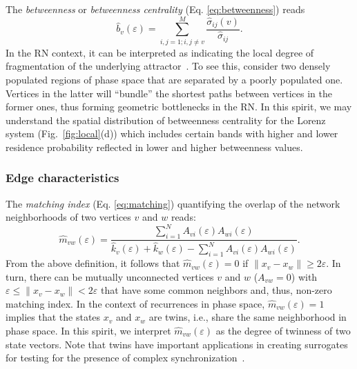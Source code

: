 The \textit{betweenness} or \textit{betweenness centrality} (Eq. \eqref{eq:betweenness}) reads 
\begin{equation}
\hat{b}_v(\varepsilon)=\sum_{i,j=1; i,j\neq v}^M \frac{\hat{\sigma}_{ij}(v)}{\hat{\sigma}_{ij}}.
\label{eq:betweennessRN}
\end{equation}
\noindent
In the RN context, it can be interpreted as indicating the local degree of fragmentation of the underlying attractor~\cite{Donner2010a}. To see this, consider two densely populated regions of phase space that are separated by a poorly populated one. Vertices in the latter will ``bundle'' the shortest paths between vertices in the former ones, thus forming geometric bottlenecks in the RN. In this spirit, we may understand the spatial distribution of betweenness centrality for the Lorenz system (Fig.~\ref{fig:local}(d)) which includes certain bands with higher and lower residence probability reflected in lower and higher betweenness values.
           
  			\subsubsection{Edge characteristics}
The \textit{matching index} (Eq. \eqref{eq:matching}) quantifying the overlap of the network neighborhoods of two vertices $v$ and $w$ reads:
\begin{equation}
\hat{m}_{vw}(\varepsilon)=\frac{\sum_{i=1}^N A_{vi}(\varepsilon) A_{wi}(\varepsilon)}{\hat{k}_v(\varepsilon)+\hat{k}_w(\varepsilon)-\sum_{i=1}^N A_{vi}(\varepsilon) A_{wi}(\varepsilon)}.
\label{eq:matchingRN}
\end{equation}
\noindent
From the above definition, it follows that $\hat{m}_{vw}(\varepsilon)=0$ if $\|x_v-x_w\|\geq 2\varepsilon$. In turn, there can be mutually unconnected vertices $v$ and $w$ ($A_{vw}=0$) with $\varepsilon\leq \|x_v-x_w\|< 2\varepsilon$ that have some common neighbors and, thus, non-zero matching index. In the context of recurrences in phase space, $\hat{m}_{vw}(\varepsilon)=1$ implies that the states $x_v$ and $x_w$ are twins, i.e., share the same neighborhood in phase space. In this spirit, we interpret $\hat{m}_{vw}(\varepsilon)$ as the degree of twinness of two state vectors. Note that twins have important applications in creating surrogates for testing for the presence of complex synchronization~\cite{thiel2006b,Romano2009}.

